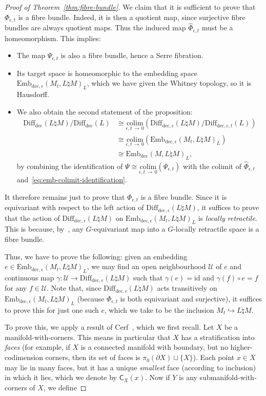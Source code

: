 \documentclass[10pt,a4paper]{amsart}
\numberwithin{equation}{section}
\newcommand{\id}{\mathrm{id}}
\newcommand{\colim}{\mathrm{colim}}
\newcommand{\rdec}{\mathrm{dec}}
\newcommand{\sC}{\mathsf{C}}
\newcommand{\cU}{\mathcal{U}}
\newcommand{\diffdec}{\ensuremath{\mathrm{Diff}_{\rdec}}}
\newcommand{\diffdece}{\ensuremath{\mathrm{Diff}_{\rdec,\epsilon}}}
\newcommand{\diffdecet}{\ensuremath{\mathrm{Diff}_{\rdec,\epsilon,t}}}
\newcommand{\embdec}{\ensuremath{\mathrm{Emb}_{\rdec}}}
\newcommand{\embdece}{\ensuremath{\mathrm{Emb}_{\rdec,\epsilon}}}
\theoremstyle{definition}
\theoremstyle{remark}
\begin{document}
\begin{proof}[Proof of Theorem~\ref{thm:fibre-bundle}]
We claim that it is sufficient to prove that $\Phi_{\epsilon,t}$ is a fibre bundle. Indeed, it is then a quotient map, since surjective fibre bundles are always quotient maps. Thus the induced map $\widehat{\Phi}_{\epsilon,t}$ must be a homeomorphism. This implies:
\begin{itemize}
\item[$\circ$] The map $\Psi_{\epsilon,t}$ is also a fibre bundle, hence a Serre fibration.
\item[$\circ$] Its target space is homeomorphic to the embedding space $\embdece(M_t,L\natural M)_L$, which we have given the Whitney topology, so it is Hausdorff.
\item[$\circ$] We also obtain the second statement of the proposition:
\begin{align*}
\diffdec(L \natural M) / \diffdec(L) &\cong
\underset{\epsilon,t\,\to\,0}{\colim}\left(\diffdece(L\natural M) / \diffdecet(L)\right) \\
&\cong \underset{\epsilon,t\,\to\,0}{\colim}\left(\embdece(M_t,L\natural M)_L\right) \\
&\cong \embdec(M,L\natural M)_L,
\end{align*}
by combining the identification of $\Psi \cong \underset{\epsilon,t\,\to\,0}{\colim}(\Psi_{\epsilon,t})$ with the colimit of $\widehat{\Phi}_{\epsilon,t}$ and~\eqref{eq:emb-colimit-identification}.
\end{itemize}

It therefore remains just to prove that $\Phi_{\epsilon,t}$ is a fibre bundle. Since it is equivariant with respect to the left action of $\diffdece(L\natural M)$, it suffices to prove that the action of $\diffdece(L\natural M)$ on $\embdece(M_t,L\natural M)_L$ is \emph{locally retractile}. This is because, by~\cite[Th.~A]{Palais1960Localtrivialityof}, any $G$-equivariant map into a $G$-locally retractile space is a fibre bundle.

Thus, we have to prove the following: given an embedding $e \in \embdece(M_t,L\natural M)_L$, we may find an open neighbourhood $\cU$ of $e$ and continuous map $\gamma \colon \cU \to \diffdece(L\natural M)$ such that $\gamma(e) = \id$ and $\gamma(f) \circ e = f$ for any $f \in \cU$. Note that, since $\diffdece(L\natural M)$ acts transitively on $\embdece(M_t,L\natural M)_L$ (because $\Phi_{\epsilon,t}$ is both equivariant and surjective), it suffices to prove this for just one such $e$, which we take to be the inclusion $M_t \hookrightarrow L \natural M$.

To prove this, we apply a result of Cerf~\cite[p.~291, Lem.~II.2.1.2]{Cerf1961Topologiedecertains}, which we first recall. Let $X$ be a manifold-with-corners. This means in particular that $X$ has a stratification into \emph{faces} (for example, if $X$ is a connected manifold with boundary, but no higher-codimension corners, then its set of faces is $\pi_{0}(\partial X) \sqcup \{X\}$). Each point $x \in X$ may lie in many faces, but it has a unique \emph{smallest} face (according to inclusion) in which it lies, which we denote by $\sC_{X}(x)$. Now if $Y$ is any submanifold-with-corners of $X$, we define


\end{proof}
\end{document}
